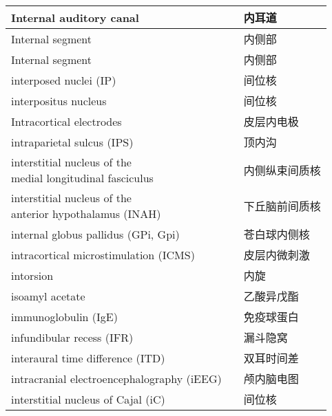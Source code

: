 \begin{longtable}{lll}
	\midrule
	Internal auditory canal   && 内耳道  \\
	
	\midrule
	Internal segment  && 内侧部  \\
	
	\midrule
	Internal segment  && 内侧部  \\
	
	\midrule
	interposed nuclei (IP)  && 间位核  \\
	
	\midrule
	interpositus nucleus  && 间位核  \\
	
	\midrule
	Intracortical electrodes   && 皮层内电极  \\
	
	\midrule
	intraparietal sulcus (IPS)   && 顶内沟  \\
	
	\midrule
	\makecell{interstitial nucleus of the \\medial longitudinal fasciculus}   && 内侧纵束间质核  \\
	
	\midrule
	\makecell{interstitial nucleus of the \\anterior hypothalamus}  (INAH) && 下丘脑前间质核  \\
	
	\midrule
	internal globus pallidus (GPi, Gpi)  && 苍白球内侧核  \\
	
	\midrule
	intracortical microstimulation (ICMS)  && 皮层内微刺激  \\
	
	\midrule
	intorsion   && 内旋  \\
	
	\midrule
	isoamyl acetate   && 乙酸异戊酯  \\
	
	\midrule
	immunoglobulin (IgE)   && 免疫球蛋白  \\
	
	\midrule
	infundibular recess (IFR)   && 漏斗隐窝  \\
	
	\midrule
	interaural time difference (ITD)   && 双耳时间差  \\
	
	\midrule
	intracranial electroencephalography (iEEG)  && 颅内脑电图  \\
	
	\midrule
	interstitial nucleus of Cajal (iC)   && 间位核  \\
	

\end{longtable}
